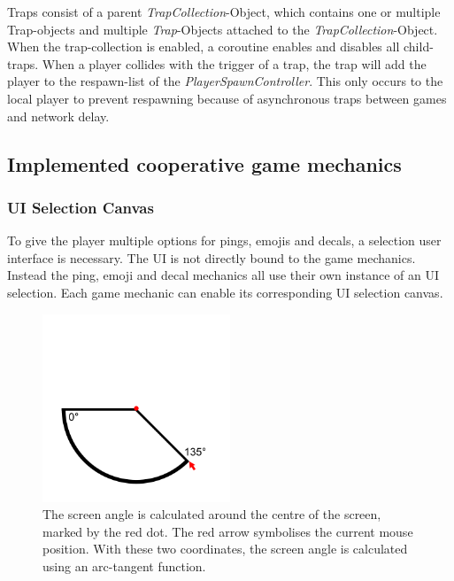 Traps consist of a parent \textit{TrapCollection}-Object, which contains one or multiple Trap-objects and multiple \textit{Trap}-Objects attached to the \textit{TrapCollection}-Object.
When the trap-collection is enabled, a coroutine enables and disables all child-traps. When a player collides with the trigger of a trap, the trap will add the player to the respawn-list of the \textit{PlayerSpawnController}. This only occurs to the local player to prevent respawning because of asynchronous traps between games and network delay.


\subsection{Implemented cooperative game mechanics}
\label{section:Implemented cooperative game mechanics}

\subsubsection{UI Selection Canvas}

To give the player multiple options for pings, emojis and decals, a selection user interface is necessary. The UI is not directly bound to the game mechanics. Instead the ping, emoji and decal mechanics all use their own instance of an UI selection.
Each game mechanic can enable its corresponding UI selection canvas.

\begin{figure}
    \centering
    \includegraphics[width=0.5\textwidth]{images/angle_calculation.png}
    \caption{The screen angle is calculated around the centre of the screen, marked by the red dot. The red arrow symbolises the current mouse position. With these two coordinates, the screen angle is calculated using an arc-tangent function.}
    \label{fig:angle calculation}
\end{figure}

